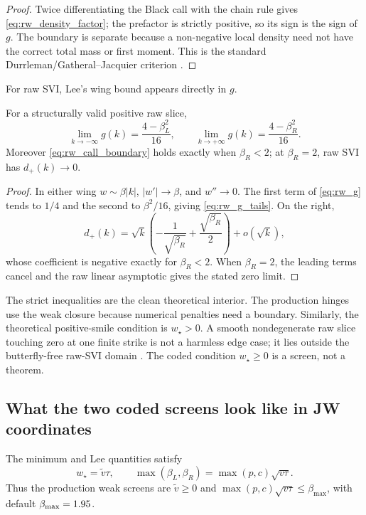 \documentclass[11pt]{article}
\newcommand{\vmin}{\widetilde v}
\newcommand{\wmin}{w_\star}
\newcommand{\betL}{\beta_L}
\newcommand{\betR}{\beta_R}
\begin{document}
\begin{proof}
Twice differentiating the Black call with the chain rule gives
\eqref{eq:rw_density_factor}; the prefactor is strictly positive, so its sign
is the sign of $g$.  The boundary is separate because a non-negative local
density need not have the correct total mass or first moment.  This is the
standard Durrleman/Gatheral--Jacquier criterion
\cite{Durrleman2010,GatheralJacquier2014}.
\end{proof}

For raw SVI, Lee's wing bound appears directly in $g$.

\begin{proposition}
\label{prop:rw_g_tails}
For a structurally valid positive raw slice,
\begin{equation}
\lim_{k\to-\infty}g(k)=\frac{4-\betL^2}{16},\qquad
\lim_{k\to+\infty}g(k)=\frac{4-\betR^2}{16}.
\label{eq:rw_g_tails}
\end{equation}
Moreover \eqref{eq:rw_call_boundary} holds exactly when $\betR<2$;
at $\betR=2$, raw SVI has $d_+(k)\to0$.
\end{proposition}

\begin{proof}
In either wing $w\sim\beta|k|$, $|w'|\to\beta$, and $w''\to0$.
The first term of \eqref{eq:rw_g} tends to $1/4$ and the second to
$\beta^2/16$, giving \eqref{eq:rw_g_tails}.  On the right,
\[
d_+(k)=\sqrt{k}\left(-\frac{1}{\sqrt{\betR}}
+\frac{\sqrt{\betR}}{2}\right)+o(\sqrt{k}),
\]
whose coefficient is negative exactly for $\betR<2$.  When $\betR=2$,
the leading terms cancel and the raw linear asymptotic gives the stated zero
limit.
\end{proof}

The strict inequalities are the clean theoretical interior.  The production
hinges use the weak closure because numerical penalties need a boundary.
Similarly, the theoretical positive-smile condition is $\wmin>0$.  A smooth
nondegenerate raw slice touching zero at one finite strike is not a harmless
edge case; it lies outside the butterfly-free raw-SVI domain
\cite{MartiniMingone2022}.  The coded condition $\wmin\ge0$ is a screen, not a
theorem.

\subsection{What the two coded screens look like in JW coordinates}

\begin{proposition}
\label{prop:rw_screens_jw}
The minimum and Lee quantities satisfy
\begin{equation}
\wmin=\vmin\tau,\qquad
\max(\betL,\betR)=\max(p,c)\sqrt{v\tau}.
\label{eq:rw_screens_jw}
\end{equation}
Thus the production weak screens are
$\vmin\ge0$ and
$\max(p,c)\sqrt{v\tau}\le\beta_{\max}$, with default
$\beta_{\max}=1.95$.
\end{proposition}
\end{document}
